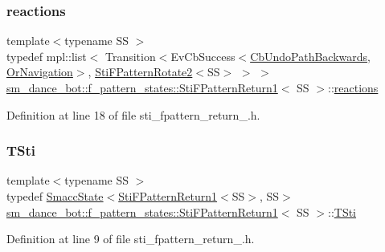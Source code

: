 \subsubsection{\texorpdfstring{reactions}{reactions}}
{\footnotesize\ttfamily template$<$typename SS $>$ \\
typedef mpl\+::list$<$ Transition$<$Ev\+Cb\+Success$<$\hyperlink{classcl__move__base__z_1_1CbUndoPathBackwards}{Cb\+Undo\+Path\+Backwards}, \hyperlink{classsm__dance__bot_1_1OrNavigation}{Or\+Navigation}$>$, \hyperlink{structsm__dance__bot_1_1f__pattern__states_1_1StiFPatternRotate2}{Sti\+F\+Pattern\+Rotate2}$<$SS$>$ $>$ $>$ \hyperlink{structsm__dance__bot_1_1f__pattern__states_1_1StiFPatternReturn1}{sm\+\_\+dance\+\_\+bot\+::f\+\_\+pattern\+\_\+states\+::\+Sti\+F\+Pattern\+Return1}$<$ SS $>$\+::\hyperlink{structsm__dance__bot_1_1f__pattern__states_1_1StiFPatternReturn1_a747aac2531a2b77a918254033102a118}{reactions}}



Definition at line 18 of file sti\+\_\+fpattern\+\_\+return\+\_.\+h.

\mbox{\label{structsm__dance__bot_1_1f__pattern__states_1_1StiFPatternReturn1_afd0d5d7e8dc6ad87f7314176d86d919e}} 
\subsubsection{\texorpdfstring{T\+Sti}{TSti}}
{\footnotesize\ttfamily template$<$typename SS $>$ \\
typedef \hyperlink{classSmaccState}{Smacc\+State}$<$\hyperlink{structsm__dance__bot_1_1f__pattern__states_1_1StiFPatternReturn1}{Sti\+F\+Pattern\+Return1}$<$SS$>$, SS$>$ \hyperlink{structsm__dance__bot_1_1f__pattern__states_1_1StiFPatternReturn1}{sm\+\_\+dance\+\_\+bot\+::f\+\_\+pattern\+\_\+states\+::\+Sti\+F\+Pattern\+Return1}$<$ SS $>$\+::\hyperlink{structsm__dance__bot_1_1f__pattern__states_1_1StiFPatternReturn1_afd0d5d7e8dc6ad87f7314176d86d919e}{T\+Sti}}



Definition at line 9 of file sti\+\_\+fpattern\+\_\+return\+\_.\+h.



